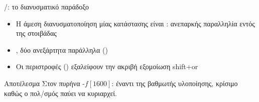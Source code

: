 \begin{frame}{/: το διανυσματικό παράδοξο}
  \begin{itemize}
    \item Η άμεση διανυσματοποίηση μίας κατάστασης  είναι : ανεπαρκής παραλληλία εντός της στοιβάδας
    \item {}, δύο ανεξάρτητα  παράλληλα ()
    \item Οι \Zvbb περιστροφές (\vror) εξαλείφουν την ακριβή εξομοίωση shift+or~\cite{Saarinen2024-vkeccak}
  \end{itemize}
  \vspace{0.5em}
  \begin{exampleblock}{Αποτέλεσμα}
    Στον πυρήνα -$f[1600]$:  έναντι της βαθμωτής υλοποίησης, κρίσιμο καθώς ο πολ/σμός παύει να κυριαρχεί.
  \end{exampleblock}
\end{frame}
